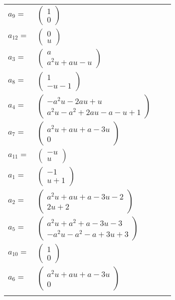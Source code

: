 \documentclass[1p]{elsarticle_modified}
\theoremstyle{definition}
\begin{document}
\begin{tabular}{m{7pt} m{180pt} m{7pt} m{180pt} }
\flushright $a_{9}=$&$\begin{pmatrix}1\\0\end{pmatrix}$ \\
\flushright $a_{12}=$&$\begin{pmatrix}0\\u\end{pmatrix}$ \\
\flushright $a_{3}=$&$\begin{pmatrix}a\\a^2 u+a u- u\end{pmatrix}$ \\
\flushright $a_{8}=$&$\begin{pmatrix}1\\- u-1\end{pmatrix}$ \\
\flushright $a_{4}=$&$\begin{pmatrix}- a^2 u-2 a u+u\\a^2 u- a^2+2 a u- a- u+1\end{pmatrix}$ \\
\flushright $a_{7}=$&$\begin{pmatrix}a^2 u+a u+a-3 u\\0\end{pmatrix}$ \\
\flushright $a_{11}=$&$\begin{pmatrix}- u\\u\end{pmatrix}$ \\
\flushright $a_{1}=$&$\begin{pmatrix}-1\\u+1\end{pmatrix}$ \\
\flushright $a_{2}=$&$\begin{pmatrix}a^2 u+a u+a-3 u-2\\2 u+2\end{pmatrix}$ \\
\flushright $a_{5}=$&$\begin{pmatrix}a^2 u+a^2+a-3 u-3\\- a^2 u- a^2- a+3 u+3\end{pmatrix}$ \\
\flushright $a_{10}=$&$\begin{pmatrix}1\\0\end{pmatrix}$ \\
\flushright $a_{6}=$&$\begin{pmatrix}a^2 u+a u+a-3 u\\0\end{pmatrix}$\\&\end{tabular}
\end{document}
